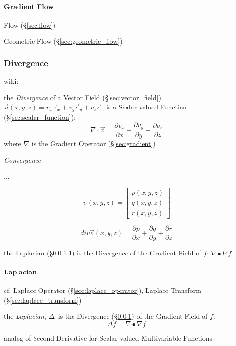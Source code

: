\paragraph{Gradient Flow}\label{sec:gradient_flow}\hfill

Flow (\S\ref{sec:flow})

Geometric Flow (\S\ref{sec:geometric_flow})



\subsubsection{Divergence}\label{sec:divergence}

wiki:

the \emph{Divergence} of a Vector Field (\S\ref{sec:vector_field})
$\vec{v}(x,y,z) = v_x\vec{e}_x + v_y\vec{e}_y + v_z\vec{e}_z$ is a
Scalar-valued Function (\S\ref{sec:scalar_function}):
\[
  \nabla \cdot \vec{v} =
    \frac{\partial v_x}{\partial x} +
    \frac{\partial v_y}{\partial y} +
    \frac{\partial v_z}{\partial z}
\]
where $\nabla$ is the Gradient Operator (\S\ref{sec:gradient})

\emph{Convergence}

...

\[
  \vec{v}(x,y,z) = \begin{bmatrix}
    p(x,y,z) \\
    q(x,y,z) \\
    r(x,y,z)
  \end{bmatrix}
\]

\[
  div\vec{v}(x,y,z)
    = \frac{\partial{p}}{\partial{x}}
    + \frac{\partial{q}}{\partial{y}}
    + \frac{\partial{r}}{\partial{z}}
\]

the Laplacian (\S\ref{sec:laplacian}) is the Divergence of the Gradient Field
of $f$: $\nabla \bullet \nabla f$



\paragraph{Laplacian}\label{sec:laplacian}\hfill

\fist cf. Laplace Operator (\S\ref{sec:laplace_operator}), Laplace Transform
(\S\ref{sec:laplace_transform}) %

the \emph{Laplacian}, $\Delta$, is the Divergence (\S\ref{sec:divergence}) of
the Gradient Field of $f$:
\[
  \Delta f = \nabla \bullet \nabla f
\]

analog of Second Derivative for Scalar-valued Multivariable Functions

